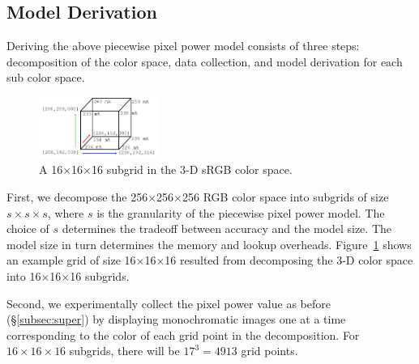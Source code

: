 

\subsection{Model Derivation}
\label{subsec:modelderivation}


Deriving the above piecewise pixel power model consists of three
steps: decomposition of the color space, data collection, and model
derivation for each sub color space.

\begin{figure}[tp]
	\includegraphics[width=0.35\textwidth]{./figure/004b_Cube_Model.png}
        \vspace{-0.1in}
	\caption{A 16$\times$16$\times$16 subgrid in the 3-D sRGB color space.}
        \vspace{-0.15in}
	\label{fig:cube_model}
\end{figure}


First, we decompose the 256$\times$256$\times$256 RGB color space into
subgrids of size $s\times s \times s$, where $s$ is the granularity of
the piecewise pixel power model. The choice of $s$ determines the
tradeoff between accuracy and the model size. The model size in turn
determines the memory and lookup
overheads. Figure~\ref{fig:cube_model} shows an example grid
of size 16$\times$16$\times$16 resulted from decomposing the
3-D color space into 16$\times$16$\times$16 subgrids.

Second, we experimentally collect the pixel power value as before
(\S\ref{subsec:super}) by displaying monochromatic images one at a time
corresponding to the color of each grid point in the decomposition. For
$16\times 16 \times 16$ subgrids, there will be $17^3 = 4913$ grid
points.

